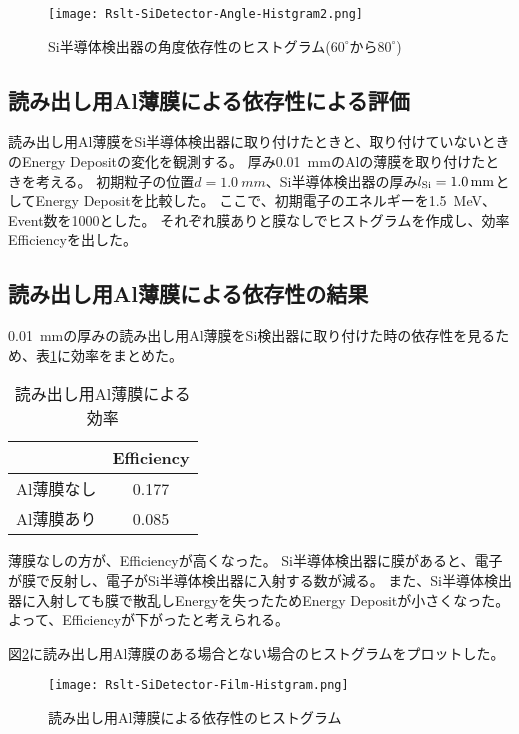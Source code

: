 \documentclass[a4paper,10pt]{jreport}
\begin{document}
\begin{figure}[H]
	\center
	\texttt{[image: Rslt-SiDetector-Angle-Histgram2.png]}
	\caption{Si半導体検出器の角度依存性のヒストグラム($60^{\circ}$から$80^{\circ}$)} \label{Rslt-SiDetector-Angle-Histgram2}
\end{figure}



	
\subsection{読み出し用Al薄膜による依存性による評価}

読み出し用Al薄膜をSi半導体検出器に取り付けたときと、取り付けていないときのEnergy Depositの変化を観測する。
厚み\SI{0.01}{mm}のAlの薄膜を取り付けたときを考える。
初期粒子の位置$d=\SI{1.0}{mm}$、Si半導体検出器の厚み$l_{\rm{Si}}=\SI{1.0}{mm}$としてEnergy Depositを比較した。
ここで、初期電子のエネルギーを\SI{1.5}{MeV}、Event数を1000とした。
それぞれ膜ありと膜なしでヒストグラムを作成し、効率Efficiencyを出した。




\subsection{読み出し用Al薄膜による依存性の結果}

\SI{0.01}{mm}の厚みの読み出し用Al薄膜をSi検出器に取り付けた時の依存性を見るため、表\ref{Tab-SiDetector-Film-Efficiency}に効率をまとめた。

\begin{table}[H] 
	\center
	\caption{読み出し用Al薄膜による効率} \label{Tab-SiDetector-Film-Efficiency}
	\begin{tabular}{cc}
		\hline
		 & Efficiency \\
		\hline
		Al薄膜なし & 0.177 \\
		Al薄膜あり & 0.085 \\
		\hline
	\end{tabular}
\end{table}

薄膜なしの方が、Efficiencyが高くなった。
Si半導体検出器に膜があると、電子が膜で反射し、電子がSi半導体検出器に入射する数が減る。
また、Si半導体検出器に入射しても膜で散乱しEnergyを失ったためEnergy Depositが小さくなった。
よって、Efficiencyが下がったと考えられる。

図\ref{Rslt-SiDetector-Film-Histgram}に読み出し用Al薄膜のある場合とない場合のヒストグラムをプロットした。

\begin{figure}[H]
	\center
	\texttt{[image: Rslt-SiDetector-Film-Histgram.png]}
	\caption{読み出し用Al薄膜による依存性のヒストグラム} \label{Rslt-SiDetector-Film-Histgram}
\end{figure}
\end{document}
